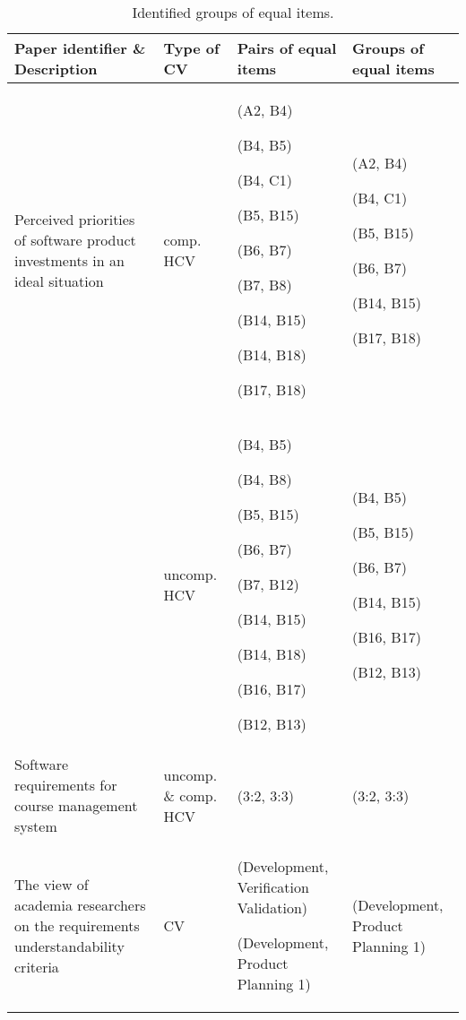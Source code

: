 \begin{table*}%
\caption{\label{tab:ECVresult}Identified groups of equal items.}

\begin{tabular}{|>{\centering}p{}|>{\centering}p{}|>{\centering}p{}|>{\centering}p{}|}
\hline 
Paper identifier \& Description  & Type of CV  & Pairs of equal items  & Groups of equal items\tabularnewline
\hline 
\citet{Barney2009} Perceived priorities of software product investments
in an ideal situation  & comp. HCV & (A2, B4)

(B4, B5)

(B4, C1)

(B5, B15)

(B6, B7)

(B7, B8)

(B14, B15)

(B14, B18)

(B17, B18) & (A2, B4)

(B4, C1)

(B5, B15)

(B6, B7)

(B14, B15)

(B17, B18)\tabularnewline
\cline{2-4}
 & uncomp. HCV & (B4, B5)

(B4, B8)

(B5, B15)

(B6, B7)

(B7, B12)

(B14, B15)

(B14, B18)

(B16, B17)

(B12, B13) & (B4, B5)

(B5, B15)

(B6, B7)

(B14, B15)

(B16, B17)

(B12, B13)\tabularnewline
\hline 
\citet{Berander2009a} Software requirements for course management system  & uncomp. \& comp. HCV  & (3:2, 3:3) & (3:2, 3:3)\tabularnewline
\hline 
\citet{Svahnberg2008} The view of academia researchers
on the requirements understandability criteria  & CV & (Development, Verification Validation)

(Development, Product Planning 1) & (Development, Product Planning 1)\tabularnewline
\hline
\end{tabular}%
\end{table*}


